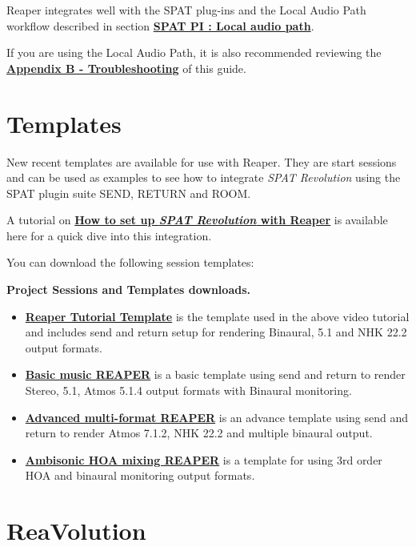 \documentclass[
  letterpaper,
  DIV=11,
  numbers=noendperiod]{scrreport}
\begin{document}
Reaper integrates well with the SPAT plug-ins and the Local Audio Path
workflow described in section
\textbf{\href{Ecosystem_\&_integration_DAW_Automation_Local_Audio_Path.md}{SPAT
PI : Local audio path}}.

If you are using the Local Audio Path, it is also recommended reviewing
the \textbf{\href{Appendix_B.md}{Appendix B - Troubleshooting}} of this
guide.

\hypertarget{templates}{%
\section{Templates}\label{templates}}

New recent templates are available for use with Reaper. They are start
sessions and can be used as examples to see how to integrate \emph{SPAT
Revolution} using the SPAT plugin suite SEND, RETURN and ROOM.

A tutorial on \textbf{\href{https://youtu.be/XRhO-FJm2KU}{How to set up
\emph{SPAT Revolution} with Reaper}} is available here for a quick dive
into this integration.

You can download the following session templates:

\textbf{Project Sessions and Templates downloads.}

\begin{itemize}
\item
  \textbf{\href{https://public.3.basecamp.com/p/gWoxvBdp33k1fb7xsoh6UAPC}{Reaper
  Tutorial Template}} is the template used in the above video tutorial
  and includes send and return setup for rendering Binaural, 5.1 and NHK
  22.2 output formats.
\item
  \textbf{\href{https://public.3.basecamp.com/p/gWoxvBdp33k1fb7xsoh6UAPC}{Basic
  music REAPER}} is a basic template using send and return to render
  Stereo, 5.1, Atmos 5.1.4 output formats with Binaural monitoring.
\item
  \textbf{\href{https://public.3.basecamp.com/p/Lnmvz9x7FhpfciDaP5mSdpVM}{Advanced
  multi-format REAPER}} is an advance template using send and return to
  render Atmos 7.1.2, NHK 22.2 and multiple binaural output.
\item
  \textbf{\href{https://public.3.basecamp.com/p/CRr6noBmpk7ms3hCarGxPMT3}{Ambisonic
  HOA mixing REAPER}} is a template for using 3rd order HOA and binaural
  monitoring output formats.
\end{itemize}

\hypertarget{reavolution}{%
\section{ReaVolution}\label{reavolution}}
\end{document}
